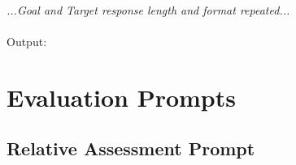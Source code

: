 \documentclass{article}
\begin{document}
\textit{\\
...Goal and Target response length and format repeated...\\
\\}
Output:


\raggedbottom

\pagebreak
\section{Evaluation Prompts}
\label{app:eval_prompts}

\subsection{Relative Assessment Prompt}
\end{document}
